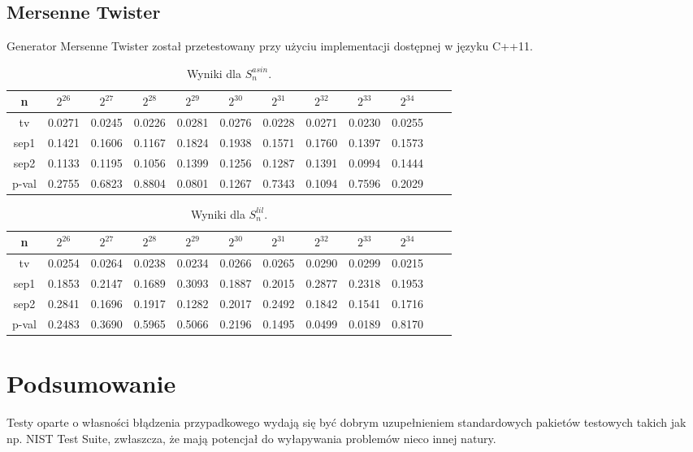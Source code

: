 \documentclass[a4paper,11pt,twoside]{book}
\newcommand{\Slil}[1]{S^{lil}_#1}
\newcommand{\Sasin}[1]{S^{asin}_#1}
\theoremstyle{definition}
\begin{document}
\FloatBarrier
\subsection{Mersenne Twister}
Generator Mersenne Twister został przetestowany przy użyciu implementacji dostępnej w języku C++11.

\begin{table}[ht!]
\centering
 \caption{Wyniki dla $\Sasin{n}$.}
 \label{tab:twister_asin}
\begin{tabular} {||c|c|c|c|c|c|c|c|c|c|c|c||}  
 \hline
     n &  $2^{26}$ &  $2^{27}$ &  $2^{28}$ &  $2^{29}$ &  $2^{30}$ &  $2^{31}$ &  $2^{32}$ &  $2^{33}$ &  $2^{34}$\\ \hline
     tv &  0.0271 &  0.0245 &  0.0226 &  0.0281 &  0.0276 &  0.0228 &  0.0271 &  0.0230 &  0.0255\\ \hline
   sep1 &  0.1421 &  0.1606 &  0.1167 &  0.1824 &  0.1938 &  0.1571 &  0.1760 &  0.1397 &  0.1573\\ \hline
   sep2 &  0.1133 &  0.1195 &  0.1056 &  0.1399 &  0.1256 &  0.1287 &  0.1391 &  0.0994 &  0.1444\\ \hline
  p-val &  0.2755 &  0.6823 &  0.8804 &  0.0801 &  0.1267 &  0.7343 &  0.1094 &  0.7596 &  0.2029\\ \hline
\end{tabular}  
\end{table}
\begin{table}[ht!]
\centering
 \caption{Wyniki dla $\Slil{n}$.}
 \label{tab:twister_lil}
\begin{tabular} {||c|c|c|c|c|c|c|c|c|c|c|c||}  
 \hline 
     n &  $2^{26}$ &  $2^{27}$ &  $2^{28}$ &  $2^{29}$ &  $2^{30}$ &  $2^{31}$ &  $2^{32}$ &  $2^{33}$ &  $2^{34}$\\ \hline
     tv &  0.0254 &  0.0264 &  0.0238 &  0.0234 &  0.0266 &  0.0265 &  0.0290 &  0.0299 &  0.0215\\ \hline
   sep1 &  0.1853 &  0.2147 &  0.1689 &  0.3093 &  0.1887 &  0.2015 &  0.2877 &  0.2318 &  0.1953\\ \hline
   sep2 &  0.2841 &  0.1696 &  0.1917 &  0.1282 &  0.2017 &  0.2492 &  0.1842 &  0.1541 &  0.1716\\ \hline
  p-val &  0.2483 &  0.3690 &  0.5965 &  0.5066 &  0.2196 &  0.1495 &  0.0499 &  0.0189 &  0.8170\\ \hline
\end{tabular}  
\end{table}


\FloatBarrier
\section{Podsumowanie}
Testy oparte o własności błądzenia przypadkowego wydają się być dobrym uzupełnieniem standardowych pakietów testowych takich jak np. NIST Test Suite, zwłaszcza, że mają potencjał do wyłapywania problemów nieco innej natury.
\end{document}

